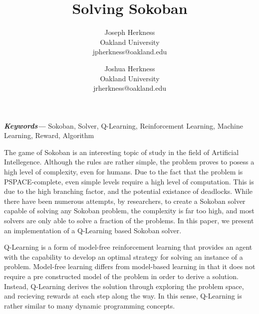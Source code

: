 \documentclass[times, 10pt,twocolumn]{article}
\begin{document}
\title{Solving Sokoban}

\author{
Joseph Herkness\\
Oakland University\\
jpherkness@oakland.edu\\
\and
Joshua Herkness\\
Oakland University\\
jrherkness@oakland.edu\\
}

\maketitle
\thispagestyle{empty}

\begin{abstract}
   
\end{abstract}

\providecommand{\keywords}[1]{\textbf{\textit{Keywords---}} #1}
\keywords{Sokoban, Solver, Q-Learning, Reinforcement Learning, Machine Learning, Reward, Algorithm}


The game of Sokoban is an interesting topic of study in the field of Artificial Intellegence. Although the rules are rather simple, the problem proves to posess a high level of complexity, even for humans. Due to the fact that the problem is PSPACE-complete, even simple levels require a high level of computation. This is due to the high branching factor, and the potential existance of deadlocks. While there have been numerous attempts, by researchers, to create a Sokoban solver capable of solving any Sokoban problem, the complexity is far too high, and most solvers are only able to solve a fraction of the problems. In this paper, we present an implementation of a Q-Learning based Sokoban solver.

Q-Learning is a form of model-free reinforcement learning that provides an agent with the capability to develop an optimal strategy for solving an instance of a problem. Model-free learning differs from model-based learning in that it does not require a pre constructed model of the problem in order to derive a solution. Instead, Q-Learning derives the solution through exploring the problem space, and recieving rewards at each step along the way. In this sense, Q-Learning is rather similar to many dynamic programming concepts.

\end{document}
